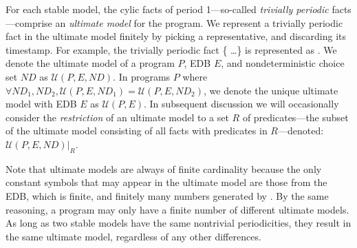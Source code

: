 
\begin{definition}
For each stable model, the cylic facts of period 1---so-called {\em trivially periodic} facts---comprise an {\em ultimate model} for the program.  We represent a trivially periodic fact in the ultimate model finitely by picking a representative, and discarding its timestamp.
For example, the trivially periodic fact \{ \ldots\} is represented as .  We denote the ultimate model of a program $P$, EDB $E$, and nondeterministic choice set $ND$ as $\mathcal{U}(P, E, ND)$.  In programs $P$ where $\forall ND_1, ND_2, \mathcal{U}(P, E, ND_1) = \mathcal{U}(P, E, ND_2)$, we denote the unique ultimate model with EDB $E$ as $\mathcal{U}(P, E)$.  In subsequent discussion we will occasionally consider the {\em restriction} of an ultimate model to a set $R$ of predicates---the subset of the ultimate model consisting of all facts with predicates in $R$---denoted: $\mathcal{U}(P, E, ND)|_{R}$.
\end{definition}

Note that ultimate models are always of finite cardinality because the only constant symbols that may appear in the ultimate model are those from the EDB, which is finite, and finitely many numbers generated by .  By the same reasoning, a \lang program may only have a finite number of different ultimate models.  As long as two stable models have the same nontrivial periodicities, they result in the same ultimate model, regardless of any other differences.  

%


